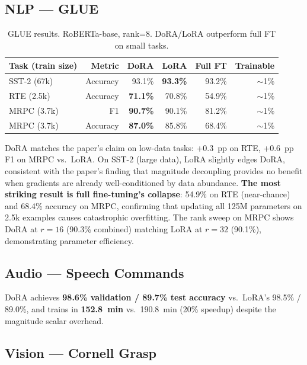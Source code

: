 \documentclass[11pt]{article}
\begin{document}
\subsection{NLP — GLUE}

\begin{table}[h!]
	\centering\small
	\begin{tabular}{@{}lrrrrr@{}}
		\toprule
		Task (train size) & Metric   & DoRA            & LoRA            & Full FT & Trainable \\
		\midrule
		SST-2 (67k)       & Accuracy & 93.1\%          & \textbf{93.3\%} & 93.2\%  & $\sim$1\% \\
		RTE (2.5k)        & Accuracy & \textbf{71.1\%} & 70.8\%          & 54.9\%  & $\sim$1\% \\
		MRPC (3.7k)       & F1       & \textbf{90.7\%} & 90.1\%          & 81.2\%  & $\sim$1\% \\
		MRPC (3.7k)       & Accuracy & \textbf{87.0\%} & 85.8\%          & 68.4\%  & $\sim$1\% \\
		\bottomrule
	\end{tabular}
	\caption{GLUE results. RoBERTa-base, rank=8. DoRA/LoRA outperform full FT on small tasks.}
\end{table}

DoRA matches the paper's claim on low-data tasks: +0.3~pp on RTE, +0.6~pp F1 on MRPC vs.\ LoRA.
On SST-2 (large data), LoRA slightly edges DoRA, consistent with the paper's finding that magnitude decoupling provides no benefit when gradients are already well-conditioned by data abundance.
\textbf{The most striking result is full fine-tuning's collapse}: 54.9\% on RTE (near-chance) and 68.4\% accuracy on MRPC, confirming that updating all 125M parameters on 2.5k examples causes catastrophic overfitting.
The rank sweep on MRPC shows DoRA at $r{=}16$ (90.3\% combined) matching LoRA at $r{=}32$ (90.1\%), demonstrating parameter efficiency.

\subsection{Audio — Speech Commands}

DoRA achieves \textbf{98.6\% validation / 89.7\% test accuracy} vs.\ LoRA's 98.5\% / 89.0\%, and trains in \textbf{152.8~min} vs.\ 190.8~min (20\% speedup) despite the magnitude scalar overhead.

\subsection{Vision — Cornell Grasp}
\end{document}
